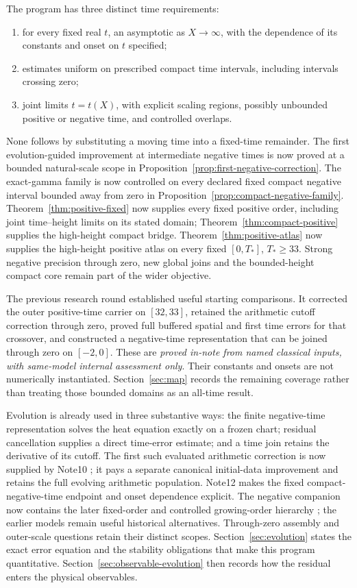 \documentclass[11pt]{article}
\numberwithin{equation}{section}
\begin{document}
The program has three distinct time requirements:
\begin{enumerate}
\item for every fixed real \(t\), an asymptotic as \(X\to\infty\),
with the dependence of its constants and onset on \(t\) specified;
\item estimates uniform on prescribed compact time intervals,
including intervals crossing zero;
\item joint limits \(t=t(X)\), with explicit scaling regions,
possibly unbounded positive or negative time, and controlled overlaps.
\end{enumerate}
None follows by substituting a moving time into a fixed-time remainder.
The first evolution-guided improvement at intermediate negative times
is now proved at a bounded natural-scale scope in
Proposition~\ref{prop:first-negative-correction}. The exact-gamma
family is now controlled on every declared fixed compact negative
interval bounded away from zero in
Proposition~\ref{prop:compact-negative-family}. Theorem~\ref{thm:positive-fixed} now supplies every fixed positive
order, including joint time--height limits on its stated domain;
Theorem~\ref{thm:compact-positive} supplies the high-height compact
bridge. Theorem~\ref{thm:positive-atlas} now supplies the high-height positive
atlas on every fixed $[0,T_*]$, $T_*\ge33$. Strong negative precision
through zero, new global joins and the bounded-height compact core
remain part of the wider objective.

The previous research round \cite{ansatz03,ansatz04,ansatz05,ansatz06}
established useful starting comparisons. It corrected the outer
positive-time carrier on \([32,33]\), retained the arithmetic cutoff
correction through zero, proved full buffered spatial and first time
errors for that crossover, and constructed a negative-time
representation that can be joined through zero on \([-2,0]\).
These are \emph{proved in-note from named classical inputs, with
same-model internal assessment only}. Their constants and onsets
are not numerically instantiated. Section~\ref{sec:map} records the
remaining coverage rather than treating those bounded domains as an
all-time result.

Evolution is already used in three substantive ways: the finite
negative-time representation solves the heat equation exactly on a
frozen chart; residual cancellation supplies a direct time-error
estimate; and a time join retains the derivative of its cutoff.
The first such evaluated arithmetic correction is now supplied by
Note10 \cite{ansatz10}; it pays a separate canonical initial-data
improvement and retains the full evolving arithmetic population.
Note12 \cite{ansatz12} makes the fixed compact-negative-time endpoint
and onset dependence explicit. The negative companion now contains the later fixed-order and
controlled growing-order hierarchy \cite{recurrence}; the earlier
models remain useful historical alternatives. Through-zero assembly
and outer-scale questions retain their distinct scopes. Section~\ref{sec:evolution} states the exact
error equation and the stability obligations that make this program
quantitative. Section~\ref{sec:observable-evolution} then records how
the residual enters the physical observables.
\end{document}
